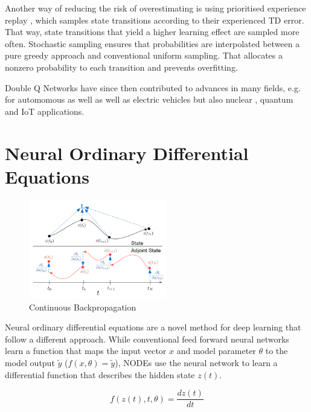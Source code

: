 \documentclass[10pt]{reportMaster}
\begin{document}
Another way of reducing the risk of overestimating is using prioritised experience replay \cite{schaul2015prioritized}, which samples state transitions according to their experienced \ac{TD} error. That way, state transitions that yield a higher learning effect are sampled more often. Stochastic sampling ensures that probabilities are interpolated between a pure greedy approach and conventional uniform sampling. That allocates a nonzero probability to each transition and prevents overfitting. 

Double Q Networks have since then contributed to advances in many fields, e.g. for automomous \cite{zhang2018human} as well as well as electric \cite{chen2022energy} vehicles but also nuclear \cite{liu2019double}, quantum \cite{he2021variational} and IoT \cite{li2020onboard} applications. 

\newpage
\section{Neural Ordinary Differential Equations} \label{Neural Ordinary Differential Equations}


\begin{figure}
\centering
\includegraphics[width=6cm]{ContinuousBackProp}
\caption{Continuous Backpropagation \cite[Figure 2]{chen2018neural}}
\label{fig:ContinuousBackProp}
\end{figure}

Neural ordinary differential equations \cite{chen2018neural} are a novel method for deep learning that follow a different approach. While conventional feed forward neural networks learn a function that maps the input vector $x$ and model parameter $\theta$ to the model output $\tilde{y}$ ($f(x, \theta)=\tilde{y}$), \ac{NODE}s use the neural network to learn a differential function that describes the hidden state $z(t)$.

\begin{equation}
\label{eq:NeuralNetworkAsHiddenStateDynamics}
f(z(t), t, \theta) = \frac{dz(t)}{dt}
\end{equation}
\end{document}
